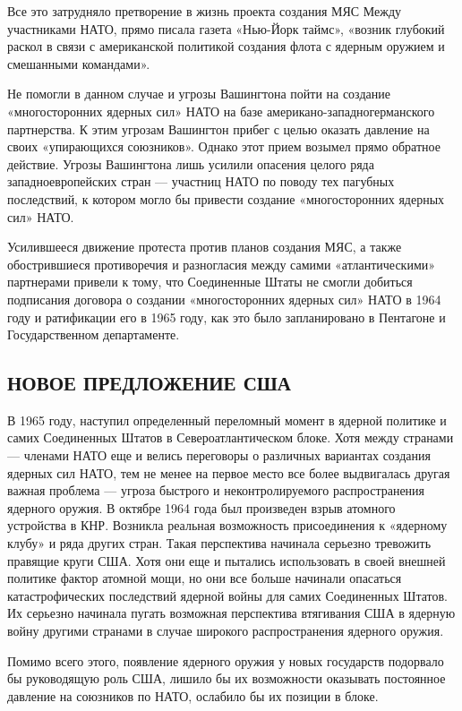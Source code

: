 \documentclass[12pt, a4paper, openany]{book}
\begin{document}
		Все это затрудняло претворение в жизнь проекта создания МЯС Между участниками НАТО, прямо писала газета «Нью-Йорк таймс», «возник глубокий раскол в связи с американской политикой создания флота с ядерным оружием и смешанными командами».
		
		Не помогли в данном случае и угрозы Вашингтона пойти на создание «многосторонних ядерных сил» НАТО на базе американо-западногерманского партнерства. К этим угрозам Вашингтон прибег с целью оказать давление на своих «упирающихся союзников». Однако этот прием возымел прямо обратное действие. Угрозы Вашингтона лишь усилили опасения целого ряда западноевропейских стран — участниц НАТО по поводу тех пагубных последствий, к котором могло бы привести создание «многосторонних ядерных сил» НАТО.
		
		Усилившееся движение протеста против планов создания МЯС, а также обострившиеся противоречия и разногласия между самими «атлантическими» партнерами привели к тому, что Соединенные Штаты не смогли добиться подписания договора о создании «многосторонних ядерных сил» НАТО в 1964 году и ратификации его в 1965 году, как это было запланировано в Пентагоне и Государственном департаменте.
		
		\subsection[Новое предложение США]{\center НОВОЕ ПРЕДЛОЖЕНИЕ США}	
		
		
		В 1965 году, наступил определенный переломный момент в ядерной политике и самих Соединенных Штатов в Североатлантическом блоке. Хотя между странами — членами НАТО еще и велись переговоры о различных вариантах создания ядерных сил НАТО, тем не менее на первое место все более выдвигалась другая важная проблема — угроза быстрого и неконтролируемого распространения ядерного оружия. В октябре 1964 года был произведен взрыв атомного устройства в КНР. Возникла реальная возможность присоединения к «ядерному клубу» и ряда других стран. Такая перспектива начинала серьезно тревожить правящие круги США. Хотя они еще и пытались использовать в своей внешней политике фактор атомной мощи, но они все больше начинали опасаться катастрофических последствий ядерной войны для самих Соединенных Штатов. Их серьезно начинала пугать возможная перспектива втягивания США в ядерную войну другими странами в случае широкого распространения ядерного оружия.
		
		Помимо всего этого, появление ядерного оружия у новых государств подорвало бы руководящую роль США, лишило бы их возможности оказывать постоянное давление на союзников по НАТО, ослабило бы их позиции в блоке.
		
\end{document}
